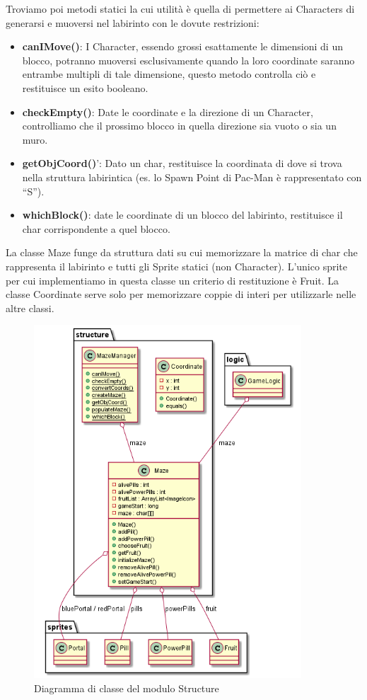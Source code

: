 \documentclass[12pt,a4paper]{report}
\begin{document}
Troviamo poi metodi statici la cui utilità è quella di permettere ai Characters di generarsi e muoversi nel labirinto con le dovute restrizioni:
\begin{itemize}
 \item \textbf{canIMove()}: I Character, essendo grossi esattamente le dimensioni di un blocco, potranno muoversi esclusivamente quando la loro coordinate saranno entrambe multipli di tale dimensione, questo metodo controlla ciò e restituisce un esito booleano.
 \item \textbf{checkEmpty()}: Date le coordinate e la direzione di un Character, controlliamo che il prossimo blocco in quella direzione sia vuoto o sia un muro.
 \item \textbf{getObjCoord()}': Dato un char, restituisce la coordinata di dove si trova nella struttura labirintica (es. lo Spawn Point di Pac-Man è rappresentato con “S”).
 \item \textbf{whichBlock()}: date le coordinate di un blocco del labirinto, restituisce il char corrispondente a quel blocco.
\end{itemize}

La classe Maze funge da struttura dati su cui memorizzare la matrice di char che rappresenta il labirinto e tutti gli Sprite statici (non Character). L’unico sprite per cui implementiamo in questa classe un criterio di restituzione è Fruit.
La classe Coordinate serve solo per memorizzare coppie di interi per utilizzarle nelle altre classi.\newpage


\begin{figure}[tb]
\begin{center}
  \includegraphics[width=10cm]{structure}
\end{center}
  \caption{Diagramma di classe del modulo Structure}
  \label{fig:structure}
\end{figure}
\end{document}
